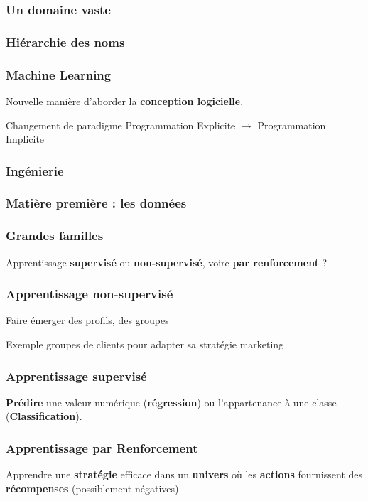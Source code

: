 \begin{frame}
  \frametitle{Un domaine vaste}
\end{frame}

\begin{frame}
  \frametitle{Hiérarchie des noms}
\end{frame}

\begin{frame}
  \frametitle{Machine Learning}
  Nouvelle manière d'aborder la \textbf{conception logicielle}.
  \vfill
  \begin{block}{Changement de paradigme}
  Programmation Explicite $\rightarrow$ Programmation Implicite
  \end{block}
\end{frame}

\begin{frame}
  \frametitle{Ingénierie}
\end{frame}

\begin{frame}
  \frametitle{Matière première : les données}
\end{frame}

\begin{frame}
  \frametitle{Grandes familles}

  Apprentissage \textbf{supervisé} ou \textbf{non-supervisé}, voire \textbf{par renforcement} ?
\end{frame}

\begin{frame}
  \frametitle{Apprentissage non-supervisé}
  Faire émerger des profils, des groupes
  \vfill
  \begin{exampleblock}{Exemple}
  groupes de clients pour adapter sa stratégie marketing
  \end{exampleblock}
\end{frame}

\begin{frame}
  \frametitle{Apprentissage supervisé}
  \textbf{Prédire} une valeur numérique (\textbf{régression}) ou l'appartenance à une classe (\textbf{Classification}).
\end{frame}

\begin{frame}
  \frametitle{Apprentissage par Renforcement}
  Apprendre une \textbf{stratégie} efficace dans un \textbf{univers} où les \textbf{actions} fournissent des \textbf{récompenses} (possiblement négatives)
  \vfill
  \begin{minipage}[l]{0.39\linewidth}
  \end{minipage}
  \begin{minipage}[l]{0.59\linewidth}
  \end{minipage}
\end{frame}

